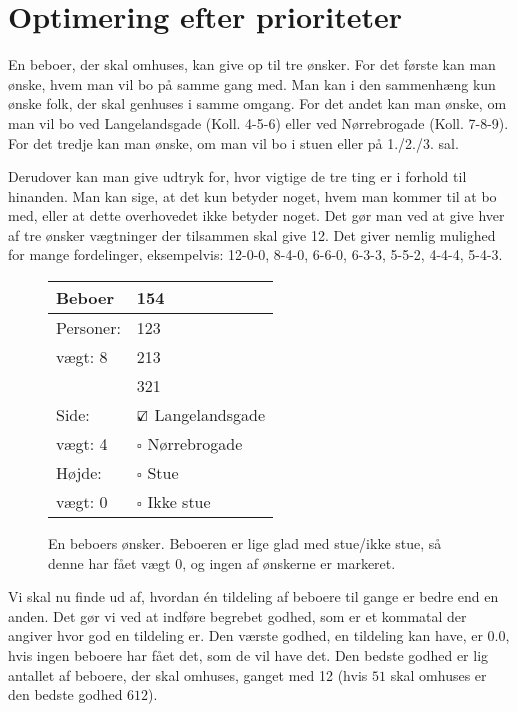 \documentclass[article,oneside,11pt]{memoir}
\begin{document}
\chapter*{Optimering efter prioriteter}

En beboer, der skal omhuses, kan give op til tre ønsker. For det første kan man
ønske, hvem man vil bo på samme gang med. Man kan i den sammenhæng kun ønske
folk, der skal genhuses i samme omgang. For det andet kan man ønske, om man vil
bo ved Langelandsgade (Koll. 4-5-6) eller ved Nørrebrogade (Koll. 7-8-9). For
det tredje kan man ønske, om man vil bo i stuen eller på 1./2./3. sal.

Derudover kan man give udtryk for, hvor vigtige de tre ting er i forhold til
hinanden. Man kan sige, at det kun betyder noget, hvem man kommer til at bo
med, eller at dette overhovedet ikke betyder noget. Det gør man ved at give
hver af tre ønsker vægtninger der tilsammen skal give 12. Det giver nemlig
mulighed for mange fordelinger, eksempelvis: 12-0-0, 8-4-0, 6-6-0, 6-3-3,
5-5-2, 4-4-4, 5-4-3.

\begin{figure}[h]
\begin{center}
\small
\begin{tabular}{ll}
\toprule
Beboer & 154 \\
\midrule
Personer: & 123 \\
vægt: 8 & 213 \\
& 321 \\
\midrule
Side: & $\text{\rlap{$\checkmark$}}\square$ Langelandsgade \\
vægt: 4 & $\square$ Nørrebrogade \\
\midrule
Højde: & $\square$ Stue \\
vægt: 0 & $\square$ Ikke stue \\
\bottomrule
\end{tabular}

\vspace{1em}
\begin{minipage}[t]{0.6\textwidth}
\caption{En beboers ønsker. Beboeren er lige glad med stue/ikke stue, så denne har fået vægt 0, og ingen af ønskerne er markeret.}
\end{minipage}
\end{center}
\end{figure}

Vi skal nu finde ud af, hvordan én tildeling af beboere til gange er bedre end
en anden. Det gør vi ved at indføre begrebet godhed, som er et kommatal der
angiver hvor god en tildeling er. Den værste godhed, en tildeling kan have, er
$0.0$, hvis ingen beboere har fået det, som de vil have det. Den bedste godhed er
lig antallet af beboere, der skal omhuses, ganget med 12 (hvis $51$ skal
omhuses er den bedste godhed $612$).
\end{document}
